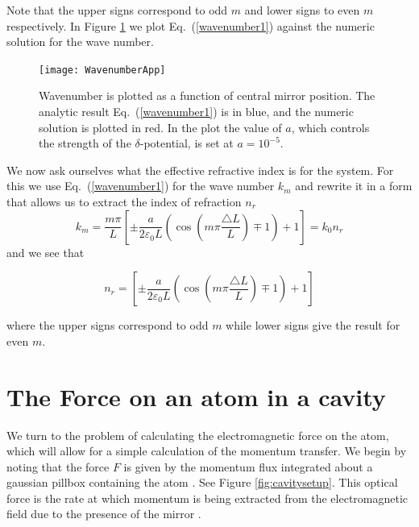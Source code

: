 \documentclass[twocolumn,english,pra,aps,superscriptaddress,floatfix]{revtex4-1}
\begin{document}
Note that the upper signs correspond to odd $m$ and lower signs to
even $m$ respectively.  In Figure \ref{fig:wavenumberapprox} we plot Eq.\ (\ref{wavenumber1}) against the numeric solution for the wave number. 



\begin{figure}
\texttt{[image: WavenumberApp]}
\caption{Wavenumber is plotted as a function of central mirror position.  The analytic result Eq.\ (\ref{wavenumber1}) is in blue, and the numeric solution is plotted in red.  In the plot the value of $a$, which controls the strength of the $\delta$-potential, is set at $a=10^{-5}$. }
\label{fig:wavenumberapprox}
\end{figure}

We now ask ourselves what the effective refractive index is for the system. For this we use Eq.\ (\ref{wavenumber1}) for the wave number $k_{m}$ and rewrite it in a form that allows us to extract the index of refraction $n_{r}$
\begin{equation}
k_{m}=\frac{m\pi}{L}\left[\pm\frac{a}{2\varepsilon_{0}L}\left(\cos(m\pi\frac{\triangle L}{L})\mp1\right)+1\right]=k_{0} n_{r}
\label{wavenumber2}
\end{equation}
and we see that

\begin{equation}
n_{r}=\left[\pm\frac{a}{2\varepsilon_{0}L}\left(\cos(m\pi\frac{\triangle L}{L})\mp1\right)+1\right]
\label{refractiveindex}
\end{equation}

where the upper signs correspond to odd $m$ while lower signs give the result for even $m$.  

\section{The Force on an atom in a cavity}
\label{sec:force}
We turn to the problem of calculating the electromagnetic force on the atom, which will allow for a simple calculation of the momentum transfer. We begin by noting that the force $F$ is given by the momentum flux integrated about a gaussian pillbox containing the atom \cite{domokos08}. See Figure \ref{fig:cavitysetup}.  This optical force is the rate at which momentum is being extracted from the electromagnetic field due to the presence of the mirror  \cite{griffiths}.  
\end{document}
